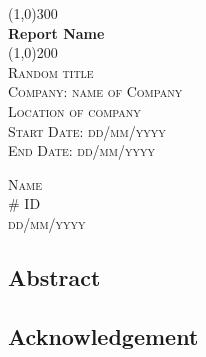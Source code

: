 \documentclass [12pt,a4paper] {article}
\begin{document}
\begin{titlepage}
	\begin{center}
	\line(1,0){300} \\
	[0.25in]
	\huge{\bfseries Report Name}\\
	[2mm]
	\line(1,0){200}\\
	[1.5cm]
	\textsc{\LARGE Random title}\\
	[0.75cm]
	

	\textsc{\Large Company: name of Company\\
	 Location of company}\\
	\textsc{\small 
		Start Date: dd/mm/yyyy
	}\\
	\textsc{\small 
		 End Date: dd/mm/yyyy
	}\\
	[5cm]

	
	\end{center}
	\begin{flushright}
	\textsc {\large Name \\
	\# ID \\
	dd/mm/yyyy \\}
	\end{flushright}
\end{titlepage}


\begin{center}
    \Large
    \vspace{0.9cm}
		\section*{Abstract}\label{sec:abstract}
\end{center}
		\lipsum[1]
\cleardoublepage

\begin{center}
    \Large
    \vspace{0.9cm}
		\section*{Acknowledgement}\label{sec:Ack}
\end{center}
		\lipsum[1]
\cleardoublepage

\tableofcontents
\thispagestyle{empty}
\cleardoublepage

\listoffigures
{}
\cleardoublepage
\end{document}

